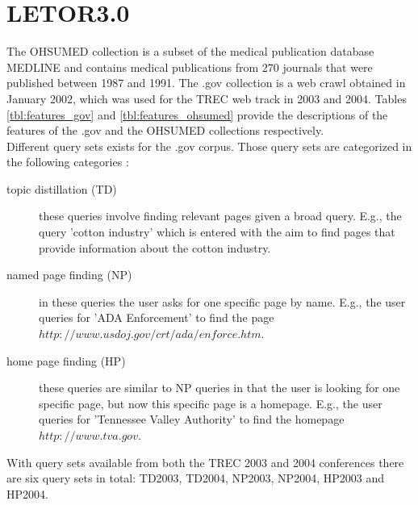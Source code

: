 \section{LETOR3.0}
The OHSUMED collection is a subset of the medical publication database MEDLINE and contains medical publications from 270 journals that were published between 1987 and 1991. The .gov collection is a web crawl obtained in January 2002, which was used for the TREC web track in 2003 and 2004. Tables \ref{tbl:features_gov} and \ref{tbl:features_ohsumed} provide the descriptions of the features of the .gov and the OHSUMED collections respectively.\\

Different query sets exists for the .gov corpus. Those query sets are categorized in the following categories \cite{}:
\begin{description}
\item[topic distillation (TD)]these queries involve finding relevant pages given a broad query. E.g., the query 'cotton industry' which is entered with the aim to find pages that provide information about the cotton industry.
\item[named page finding (NP)]in these queries the user asks for one specific page by name. E.g., the user queries for 'ADA Enforcement' to find the page $http://www.usdoj.gov/crt/ada/enforce.htm$.
\item[home page finding (HP)]these queries are similar to NP queries in that the user is looking for one specific page, but now this specific page is a homepage. E.g., the user queries for 'Tennessee Valley Authority' to find the homepage $http://www.tva.gov$.
\end{description}
With query sets available from both the TREC 2003 and 2004 conferences there are six query sets in total: TD2003, TD2004, NP2003, NP2004, HP2003 and HP2004.\\

